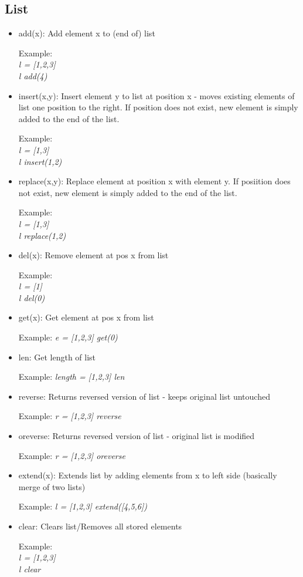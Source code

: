 \documentclass{article}
\begin{document}
\subsection{List}
\label{listbuilt}
\begin{itemize}
\item add(x): Add element x to (end of) list

Example: \\ \textit{l = [1,2,3]} \\ \textit{l add(4)}

\item insert(x,y): Insert element y to list at position x - moves existing elements of list one position to the right. If position does not exist, new element is simply added to the end of the list.

Example: \\ \textit{l = [1,3]} \\ \textit{l insert(1,2)}

\item replace(x,y): Replace element at position x with element y. If posiition does not exist, new element is simply added to the end of the list.

Example: \\ \textit{l = [1,3]} \\ \textit{l replace(1,2)}

\item del(x): Remove element at pos x from list

Example: \\ \textit{l = [1]} \\ \textit{l del(0)}

\item get(x): Get element at pos x from list

Example: \textit{e = [1,2,3] get(0)}

\item len: Get length of list

Example: \textit{length = [1,2,3] len}

\item reverse: Returns reversed version of list - keeps original list untouched

Example: \textit{r = [1,2,3] reverse}

\item oreverse: Returns reversed version of list - original list is modified

Example: \textit{r = [1,2,3] oreverse}

\item extend(x): Extends list by adding elements from x to left side (basically merge of two lists)

Example: \textit{l = [1,2,3] extend([4,5,6])}

\item clear: Clears list/Removes all stored elements

Example: \\ \textit{l = [1,2,3]} \\ \textit{l clear}
\end{itemize}
\end{document}
